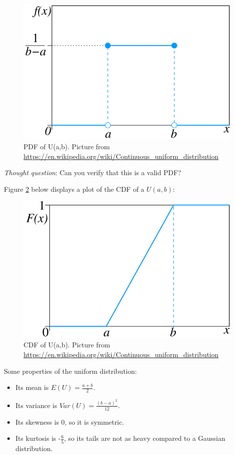 \documentclass[
]{book}
\providecommand{\tightlist}{%
  \setlength{\itemsep}{0pt}\setlength{\parskip}{0pt}}
\begin{document}
\begin{figure}
\centering
\includegraphics{images/04-U.png}
\caption{\label{fig:4-U}PDF of U(a,b). Picture from \url{https://en.wikipedia.org/wiki/Continuous_uniform_distribution}}
\end{figure}

\emph{Thought question}: Can you verify that this is a valid PDF?

Figure \ref{fig:4-Ucdf} below displays a plot of the CDF of a \(U(a,b)\):

\begin{figure}
\centering
\includegraphics{images/04-Ucdf.png}
\caption{\label{fig:4-Ucdf}CDF of U(a,b). Picture from \url{https://en.wikipedia.org/wiki/Continuous_uniform_distribution}}
\end{figure}

Some properties of the uniform distribution:

\begin{itemize}
\tightlist
\item
  Its mean is \(E(U) = \frac{a+b}{2}\).
\item
  Its variance is \(Var(U) = \frac{(b-a)^2}{12}\).
\item
  Its skewness is 0, so it is symmetric.
\item
  Its kurtosis is -\(\frac{6}{5}\), so its tails are not as heavy compared to a Gaussian distribution.
\end{itemize}
\end{document}
